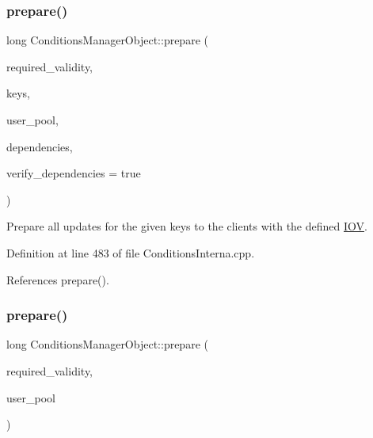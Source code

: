 \subsubsection{\texorpdfstring{prepare()}{prepare()}\hspace{0.1cm}{\footnotesize\ttfamily [2/4]}}
{\footnotesize\ttfamily long Conditions\+Manager\+Object\+::prepare (\begin{DoxyParamCaption}\item[{const \hyperlink{class_d_d4hep_1_1_i_o_v}{I\+OV} \&}]{required\+\_\+validity,  }\item[{const \hyperlink{class_d_d4hep_1_1_conditions_1_1_conditions_manager_object_aad75140018040c6ad49e56a4d56a35ee}{Condition\+Keys} \&}]{keys,  }\item[{\hyperlink{class_d_d4hep_1_1dd4hep__ptr}{dd4hep\+\_\+ptr}$<$ \hyperlink{class_d_d4hep_1_1_conditions_1_1_user_pool}{User\+Pool} $>$ \&}]{user\+\_\+pool,  }\item[{const \hyperlink{class_d_d4hep_1_1_conditions_1_1_conditions_manager_object_a539905074db3aee8b401d575649dbdd8}{Dependencies} \&}]{dependencies,  }\item[{bool}]{verify\+\_\+dependencies = {\ttfamily true} }\end{DoxyParamCaption})}



Prepare all updates for the given keys to the clients with the defined \hyperlink{class_d_d4hep_1_1_i_o_v}{I\+OV}. 



Definition at line 483 of file Conditions\+Interna.\+cpp.



References prepare().

\hypertarget{class_d_d4hep_1_1_conditions_1_1_conditions_manager_object_a4550e641d43365715516abc3f82586e6}{}\label{class_d_d4hep_1_1_conditions_1_1_conditions_manager_object_a4550e641d43365715516abc3f82586e6} 
\subsubsection{\texorpdfstring{prepare()}{prepare()}\hspace{0.1cm}{\footnotesize\ttfamily [3/4]}}
{\footnotesize\ttfamily long Conditions\+Manager\+Object\+::prepare (\begin{DoxyParamCaption}\item[{const \hyperlink{class_d_d4hep_1_1_i_o_v}{I\+OV} \&}]{required\+\_\+validity,  }\item[{\hyperlink{class_d_d4hep_1_1dd4hep__ptr}{dd4hep\+\_\+ptr}$<$ \hyperlink{class_d_d4hep_1_1_conditions_1_1_user_pool}{User\+Pool} $>$ \&}]{user\+\_\+pool }\end{DoxyParamCaption})}



